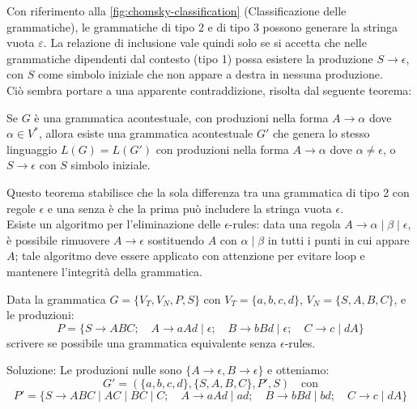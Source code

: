 \documentclass{article}
\begin{document}
\noindent Con riferimento alla \cref{fig:chomsky-classification} (Classificazione delle grammatiche), le grammatiche di tipo 2 e  di tipo 3  possono generare la stringa vuota \( \varepsilon \). La relazione di inclusione vale quindi solo se si accetta che nelle grammatiche dipendenti dal contesto (tipo 1) possa esistere la produzione \( S \rightarrow \epsilon \), con \( S \) come simbolo iniziale che non appare a destra in nessuna produzione.\\Ciò sembra portare a una apparente contraddizione, risolta dal seguente teorema:\\
\begin{teo}
Se \( G \) è una grammatica acontestuale, con produzioni nella forma \( A \rightarrow \alpha \) dove \( \alpha \in V^* \), allora esiste una grammatica acontestuale \( G' \) che genera lo stesso linguaggio \( L(G) = L(G') \) con produzioni nella forma \( A \rightarrow \alpha \) dove \( \alpha \neq \epsilon \), o \( S \rightarrow \epsilon \) con \( S \) simbolo iniziale. 
\end{teo}
Questo teorema stabilisce che la sola differenza tra una grammatica di tipo 2 con regole \( \epsilon \) e una senza è che la prima può includere la stringa vuota \( \epsilon \). \\Esiste un algoritmo per l'eliminazione delle \( \epsilon \)-rules: data una regola \( A \rightarrow \alpha \mid \beta \mid \epsilon \), è possibile rimuovere \( A \rightarrow \epsilon \) sostituendo \( A \) con \( \alpha \mid \beta \) in tutti i punti in cui appare \( A \); tale algoritmo deve essere applicato con attenzione per evitare loop e mantenere l'integrità della grammatica.\\
\begin{example}
Data la grammatica \( G = \{ V_T, V_N, P, S \} \) con \( V_T = \{ a, b, c, d \} \), \( V_N = \{ S, A, B, C \} \), e le produzioni:
\[
P = \{ 
S \rightarrow ABC; \quad 
A \rightarrow aAd \mid \epsilon; \quad 
B \rightarrow bBd \mid \epsilon; \quad 
C \rightarrow c \mid dA 
\}
\]
scrivere se possibile una grammatica equivalente senza \(\epsilon\)-rules.

\noindent
Soluzione: Le produzioni nulle sono \( \{ A \rightarrow \epsilon, B \rightarrow \epsilon \} \) e otteniamo:
\[
G' = \left( \{ a, b, c, d \}, \{ S, A, B, C \}, P', S \right) \quad \text{con}
\]
\[
P' = \{ 
S \rightarrow ABC \mid AC \mid BC \mid C; \quad 
A \rightarrow aAd \mid ad; \quad 
B \rightarrow bBd \mid bd; \quad 
C \rightarrow c \mid dA 
\}
\]
\end{example}
\end{document}
